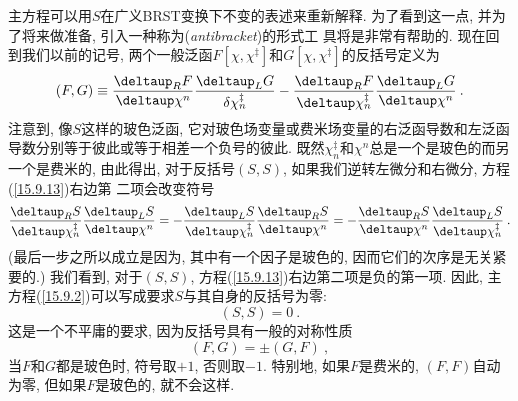 主方程可以用$S$在广义BRST变换下不变的表述来重新解释. 为了看到这一点, 并为了将来做准备, 引入一种称为{}(\emph{antibracket})的形式工%
具将是非常有帮助的. 现在回到我们以前的记号, 两个一般泛函$F[\chi ,\chi ^{\ddag }]$和$G[\chi ,\chi ^{\ddag }]$的反括号定义为
\begin{equation}
(F,G)\equiv \frac{\deltaup _{R}F}{\deltaup \chi ^{n}}\frac{\deltaup _{L}G}{\delta
\chi _{n}^{\ddag }}-\frac{\deltaup _{R}F}{\deltaup \chi _{n}^{\ddag }}\frac{%
\deltaup _{L}G}{\deltaup \chi ^{n}}\:.   \label{15.9.13}
\end{equation}
注意到, 像$S$这样的玻色泛函, 它对玻色场变量或费米场变量的右泛函导数和左泛函导数分别等于彼此或等于相差一个负号的彼此. 既然$\chi _{n}^{\ddag }$和$\chi
^{n}$总是一个是玻色的而另一个是费米的, 由此得出, 对于反括号$(S,S)$, 如果我们逆转左微分和右微分, 方程(\ref{15.9.13})右边第%
二项会改变符号\[
\frac{\deltaup _{R}S}{\deltaup \chi _{n}^{\ddag }}\frac{\deltaup _{L}S}{\deltaup
\chi ^{n}}=-\frac{\deltaup _{L}S}{\deltaup \chi _{n}^{\ddag }}\frac{\deltaup _{R}S%
}{\deltaup \chi ^{n}}=-\frac{\deltaup _{R}S}{\deltaup \chi ^{n}}\frac{\deltaup _{L}S}{%
\deltaup \chi _{n}^{\ddag }}\:. 
\]%
(最后一步之所以成立是因为, 其中有一个因子是玻色的, 因而它们的次序是无关紧要的.) 我们看到, 对于$(S,S)$, 方程(\ref{15.9.13})右边第二项是负的第一项. 因此, 
主方程(\ref{15.9.2})可以写成要求$S$与其自身的反括号为零:%
\begin{equation}
(S,S)=0\:.   \label{15.9.14}
\end{equation}%
这是一个不平庸的要求, 因为反括号具有一般的对称性质
\begin{equation}
(F,G)=\pm (G,F)\:,   \label{15.9.15}
\end{equation}%
当$F$和$G$都是玻色时, 符号取$+1$, 否则取$-1$. 特别地, 如果$F$是费米的, $(F,F)$自动为零, 但如果$F$是玻色的, 就不会这样.

